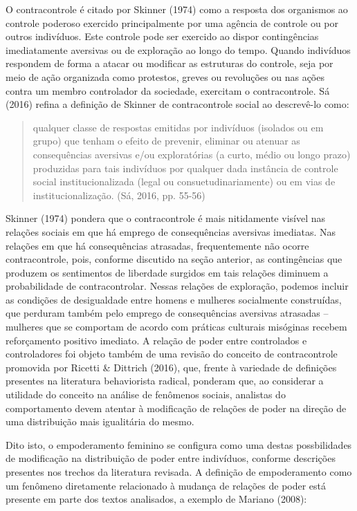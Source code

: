 O contracontrole é citado por Skinner (1974) como a resposta dos organismos ao controle poderoso exercido principalmente por uma agência de controle ou por outros indivíduos. Este controle pode ser exercido ao dispor contingências imediatamente aversivas ou de exploração ao longo do tempo. Quando indivíduos respondem de forma a atacar ou modificar as estruturas do controle, seja por meio de ação organizada como protestos, greves ou revoluções ou nas ações contra um membro controlador da sociedade, exercitam o contracontrole. Sá (2016) refina a definição de Skinner de contracontrole social ao descrevê-lo como:

\begin{quote}
    qualquer classe de respostas emitidas por indivíduos (isolados ou em grupo) que tenham o efeito de prevenir, eliminar ou atenuar as consequências aversivas e/ou exploratórias (a curto, médio ou longo prazo) produzidas para tais indivíduos por qualquer dada instância de controle social institucionalizada (legal ou consuetudinariamente) ou em vias de institucionalização. (Sá, 2016, pp. 55-56)
\end{quote}

Skinner (1974) pondera que o contracontrole é mais nitidamente visível nas relações sociais em que há emprego de consequências aversivas imediatas. Nas relações em que há consequências atrasadas, frequentemente não ocorre contracontrole, pois, conforme discutido na seção anterior, as contingências que produzem os sentimentos de liberdade surgidos em tais relações diminuem a probabilidade de contracontrolar. Nessas relações de exploração, podemos incluir as condições de desigualdade entre homens e mulheres socialmente construídas, que perduram também pelo emprego de consequências aversivas atrasadas – mulheres que se comportam de acordo com práticas culturais misóginas recebem reforçamento positivo imediato. A relação de poder entre controlados e controladores foi objeto também de uma revisão do conceito de contracontrole promovida por Ricetti \& Dittrich (2016), que, frente à variedade de definições presentes na literatura behaviorista radical, ponderam que, ao considerar a utilidade do conceito na análise de fenômenos sociais, analistas do comportamento devem atentar à modificação de relações de poder na direção de uma distribuição mais igualitária do mesmo.

Dito isto, o empoderamento feminino se configura como uma destas possbilidades de modificação na distribuição de poder entre indivíduos, conforme descrições presentes nos trechos da literatura revisada. A definição de empoderamento como um fenômeno diretamente relacionado à mudança de relações de poder está presente em parte dos textos analisados, a exemplo de Mariano (2008):

